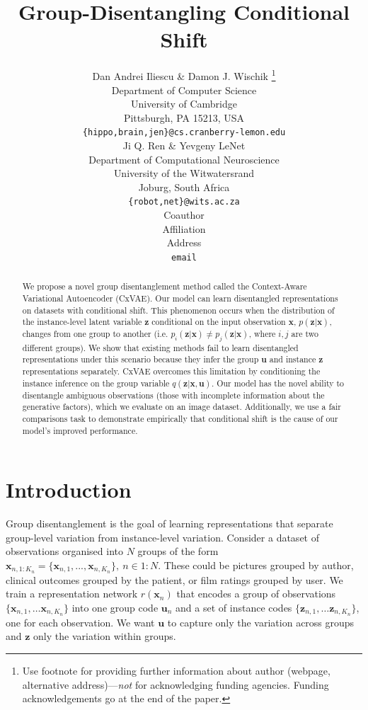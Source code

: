 \documentclass{article} %
\title{Group-Disentangling Conditional Shift}
\author{Dan Andrei Iliescu \& Damon J. Wischik \thanks{ Use footnote for providing further information
about author (webpage, alternative address)---\emph{not} for acknowledging
funding agencies.  Funding acknowledgements go at the end of the paper.} \\
Department of Computer Science\\
University of Cambridge\\
Pittsburgh, PA 15213, USA \\
\texttt{\{hippo,brain,jen\}@cs.cranberry-lemon.edu} \\
\And
Ji Q. Ren \& Yevgeny LeNet \\
Department of Computational Neuroscience \\
University of the Witwatersrand \\
Joburg, South Africa \\
\texttt{\{robot,net\}@wits.ac.za} \\
\AND
Coauthor \\
Affiliation \\
Address \\
\texttt{email}
}
\newcommand{\change}[1]{#1}
\begin{document}
\maketitle

\begin{abstract}
We propose a novel group disentanglement method called the Context-Aware Variational Autoencoder (CxVAE). Our model can learn disentangled representations on datasets with conditional shift. This phenomenon occurs when the distribution of the instance-level latent variable $\mathbf{z}$ conditional on the input observation $\mathbf{x}$, $p(\mathbf{z}|\mathbf{x})$, changes from one group to another (i.e. $p_i(\mathbf{z}|\mathbf{x}) \neq p_j(\mathbf{z}|\mathbf{x})$, where $i,j$ are two different groups). We show that existing methods fail to learn disentangled representations under this scenario because they infer the group $\mathbf{u}$ and instance $\mathbf{z}$ representations separately. CxVAE overcomes this limitation by conditioning the instance inference on the group variable $q(\mathbf{z}|\mathbf{x},\mathbf{u})$. Our model has the novel ability to disentangle ambiguous observations (those with incomplete information about the generative factors), \change{which we evaluate on an image dataset}. Additionally, we \change{use a fair comparisons task to} demonstrate empirically that conditional shift is the cause of our model's improved performance.
\end{abstract}

\section{Introduction}
\label{intro}

Group disentanglement is the goal of learning representations that separate group-level variation from instance-level variation. Consider a dataset of observations organised into $N$ groups of the form $\mathbf{x}_{n,1:K_n} = \{\mathbf{x}_{n,1}, ..., \mathbf{x}_{n,K_n}\}, ~ n \in 1:N$. These could be pictures grouped by author, clinical outcomes grouped by the patient, or film ratings grouped by user.  We train a representation network $r(\mathbf{x}_n)$ that encodes a group of observations $\{\mathbf{x}_{n, 1}, \dots \mathbf{x}_{n,K_n}\}$ into one group code $\mathbf{u}_n$ and a set of instance codes $\{\mathbf{z}_{n,1}, \dots \mathbf{z}_{n, K_n}\}$, one for each observation. We want $\mathbf{u}$ to capture only the variation across groups and $\mathbf{z}$ only the variation within groups. 
\end{document}
